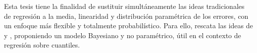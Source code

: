 Esta tesis tiene la finalidad de sustituir simult\'aneamente las ideas tradicionales de regresi\'on a la media, linearidad y distribuci\'on param\'etrica de los errores, con un enfoque m\'as flexible y totalmente probabil\'istico. Para ello, rescata las ideas de \cite{Kottas_NotParamQuantReg} y \cite{Kottas_SemiparamQuantReg}, proponiendo un modelo Bayesiano y no param\'etrico, \'util en el contexto de regresi\'on sobre cuantiles.

\newpage